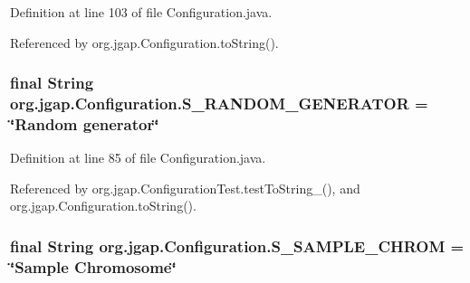 Definition at line 103 of file Configuration.\-java.



Referenced by org.\-jgap.\-Configuration.\-to\-String().

\hypertarget{classorg_1_1jgap_1_1_configuration_a5a5f7c88c3f255a3a79d3d761e0b74a9}{
\subsubsection[{S\-\_\-\-R\-A\-N\-D\-O\-M\-\_\-\-G\-E\-N\-E\-R\-A\-T\-O\-R}]{\setlength{\rightskip}{0pt plus 5cm}final String org.\-jgap.\-Configuration.\-S\-\_\-\-R\-A\-N\-D\-O\-M\-\_\-\-G\-E\-N\-E\-R\-A\-T\-O\-R = \char`\"{}Random generator\char`\"{}\hspace{0.3cm}{\ttfamily [static]}}}\label{classorg_1_1jgap_1_1_configuration_a5a5f7c88c3f255a3a79d3d761e0b74a9}


Definition at line 85 of file Configuration.\-java.



Referenced by org.\-jgap.\-Configuration\-Test.\-test\-To\-String\-\_(), and org.\-jgap.\-Configuration.\-to\-String().

\hypertarget{classorg_1_1jgap_1_1_configuration_aff569b9cf58f24a5ba5c817936bd8eaf}{
\subsubsection[{S\-\_\-\-S\-A\-M\-P\-L\-E\-\_\-\-C\-H\-R\-O\-M}]{\setlength{\rightskip}{0pt plus 5cm}final String org.\-jgap.\-Configuration.\-S\-\_\-\-S\-A\-M\-P\-L\-E\-\_\-\-C\-H\-R\-O\-M = \char`\"{}Sample {\bf Chromosome}\char`\"{}\hspace{0.3cm}{\ttfamily [static]}}}\label{classorg_1_1jgap_1_1_configuration_aff569b9cf58f24a5ba5c817936bd8eaf}


